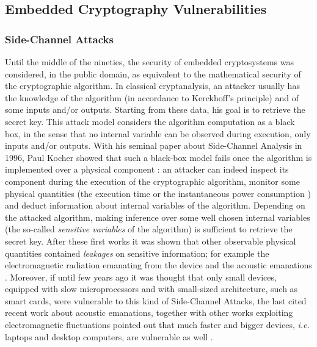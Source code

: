 \subsection{Embedded Cryptography Vulnerabilities}\label{sec:vulnerabilities}
\subsubsection{Side-Channel Attacks}\label{sec:SCAintro}
Until the middle of the nineties, the security of embedded cryptosystems was considered, in the public domain, as equivalent to the mathematical security of the cryptographic algorithm. In classical cryptanalysis, an attacker usually has the knowledge of the algorithm (in accordance to Kerckhoff's principle) and of some inputs and/or outputs. Starting from these data, his goal is to retrieve the secret key. This attack model considers the algorithm computation as a black box, in the sense that no internal variable can be observed during execution, only inputs and/or outputs. With his seminal paper about Side-Channel Analysis in 1996, Paul Kocher showed that such a black-box model fails once the algorithm is implemented over a physical component \cite{kocher1996timing}: an attacker can indeed inspect its component during the execution of the cryptographic algorithm, monitor some physical quantities (\eg the execution time \cite{kocher1996timing} or the instantaneous power consumption \cite{kocher1999differential}) and deduct information about internal variables of the algorithm. Depending on the attacked algorithm, making inference over some well chosen internal variables (the so-called \emph{sensitive variables} of the algorithm) is sufficient to retrieve the secret key. After these first works it was shown that other observable physical quantities contained \emph{leakages} on sensitive information; for example the electromagnetic radiation emanating from the device \cite{gandolfi2001electromagnetic,quisquater2001electromagnetic} and the acoustic emanations \cite{genkin2014rsa}. Moreover, if until few years ago it was thought that only small devices, equipped with slow microprocessors and with small-sized architecture, such as smart cards, were vulnerable to this kind of Side-Channel Attacks, the last cited recent work about acoustic emanations, together with other works exploiting electromagnetic fluctuations pointed out that much faster and bigger devices, \emph{i.e.} laptops and desktop computers, are vulnerable as well \cite{genkin2015stealing,genkin2015get,genkin2016ecdh}.

